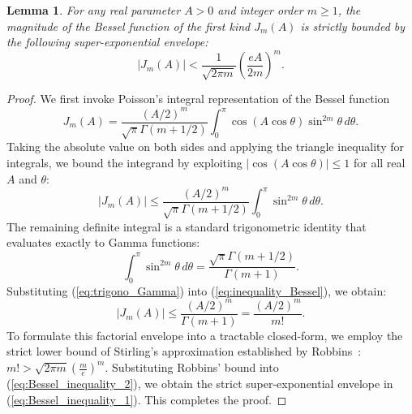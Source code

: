 \documentclass[lettersize,journal]{IEEEtran}
\theoremstyle{plain}
\newtheorem{lemma}{Lemma}
\begin{document}
\section{}
\begin{lemma}
	For any real parameter $A > 0$ and integer order $m \ge 1$, the magnitude of the Bessel function of the first kind $J_m(A)$ is strictly bounded by the following super-exponential envelope:
	\begin{equation}
		\left|J_m(A)\right| < \frac{1}{\sqrt{2\pi m}} \left( \frac{e A}{2 m} \right)^m.
		\label{eq:Bessel_inequality_1}
	\end{equation}
	\label{lemma:Bessel_inequality}
\end{lemma}
\begin{proof}
	We first invoke Poisson's integral representation of the Bessel function~\cite[Eq.9.1.20]{Abramowitz1964Handbook}
	$$
		J_m(A) = \frac{(A/2)^m}{\sqrt{\pi} \Gamma(m + 1/2)} \int_0^\pi \cos(A \cos \theta) \sin^{2m} \theta \, d\theta.
	$$
	Taking the absolute value on both sides and applying the triangle inequality for integrals, we bound the integrand by exploiting $\left|\cos(A \cos \theta)\right| \le 1$ for all real $A$ and $\theta$:
	\begin{equation}
		\left|J_m(A)\right| \le \frac{(A/2)^m}{\sqrt{\pi} \Gamma(m + 1/2)} \int_0^\pi \sin^{2m} \theta \, d\theta.
		\label{eq:inequality_Bessel}
	\end{equation}
	The remaining definite integral is a standard trigonometric identity that evaluates exactly to Gamma functions:
	\begin{equation}
		\int_0^\pi \sin^{2m} \theta \, d\theta = \frac{\sqrt{\pi} \Gamma(m + 1/2)}{\Gamma(m + 1)}.
		\label{eq:trigono_Gamma}
	\end{equation}
	Substituting (\ref{eq:trigono_Gamma}) into (\ref{eq:inequality_Bessel}), we obtain:
	\begin{equation}
		\left|J_m(A)\right| \le \frac{(A/2)^m}{\Gamma(m + 1)} = \frac{(A/2)^m}{m!}.
		\label{eq:Bessel_inequality_2}
	\end{equation}
	To formulate this factorial envelope into a tractable closed-form, we employ the strict lower bound of Stirling's approximation established by Robbins~\cite{robbins1955remark}: $m! > \sqrt{2\pi m} \left( \frac{m}{e} \right)^m$.
	Substituting Robbins' bound into (\ref{eq:Bessel_inequality_2}), we obtain the strict super-exponential envelope in (\ref{eq:Bessel_inequality_1}).
	This completes the proof.
\end{proof}
	
\end{document}
